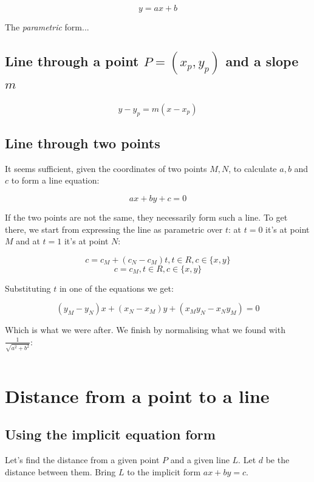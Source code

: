 \documentclass[12pt,openany,a4,usenames,dvipsnames]{book}
\begin{document}
$$y=ax+b$$

The \emph{parametric} form... %


\section{Line through a point $P=(x_p,y_p)$ and a slope $m$}

$$y-y_p=m(x-x_p)$$

\section{Line through two points}
\begin{figure}[H]
\centering

\end{figure}
It seems sufficient, given the coordinates of two points $M, N$, to calculate $a, b$ and $c$ to form a line equation:

$$ax+by+c=0$$

If the two points are not the same, they necessarily form such a line. To get there, we start from expressing the line as parametric over $t$: at $t=0$ it's at point $M$ and at $t=1$ it's at point $N$:

$$c = c_M + (c_N - c_M)t, t\in R, c \in \{x, y\}$$
$$c = c_M, t\in R, c \in \{x, y\}$$

Substituting $t$ in one of the equations we get:

$$(y_M - y_N)x + (x_N-x_M)y+(x_{M}y_{N}-x_{N}y_{M})=0$$

Which is what we were after. We finish by normalising what we found with $\frac{1}{\sqrt{a^2+b^2}}$:
\begin{verbatim}
\end{verbatim}

\chapter{Distance from a point to a line}
\begin{figure}[H]
\centering

\end{figure}

\section{Using the implicit equation form}
Let's find the distance from a given point $P$ and a given line $L$. Let $d$ be the distance between them. Bring $L$ to the implicit form $ax+by=c$.
\end{document}
